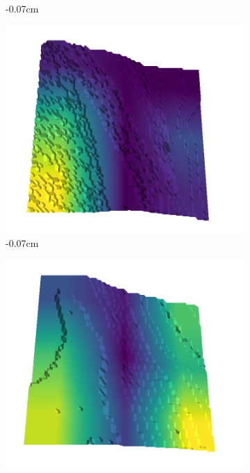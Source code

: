 \documentclass[../document.tex]{subfiles}
\begin{document}
\begin{figure}[H]
\begin{subfigure}[b]{0.242\linewidth}
        \caption{-0.07cm}
        \end{subfigure}
        \begin{subfigure}[b]{0.242\linewidth}
        \includegraphics[width=\linewidth]{../img/5/quarry/false_negative/00-patch-3d-majavi-colormap-20.png}
        \caption{-0.07cm}
        \end{subfigure}
        \begin{subfigure}[b]{0.242\linewidth}
        \includegraphics[width=\linewidth]{../img/5/quarry/false_negative/00-patch-3d-majavi-colormap-25.png}

\end{subfigure}
\end{figure}
\end{document}
